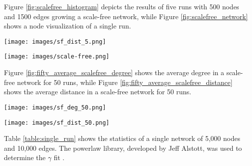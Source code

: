 \documentclass[journal]{IEEEtran}
\begin{document}
\noindent Figure \ref{fig:scalefree_histogram} depicts the results of five runs with 500 nodes and 1500 edges growing a scale-free network, while Figure \ref{fig:scalefree_network} shows a node visualization of a single run.

\begingroup
    \centering
    \medskip
    \texttt{[image: images/sf\_dist\_5.png]}
    \label{fig:scalefree_histogram}
    \medskip
\endgroup

\bigskip
\bigskip
\bigskip

\begingroup
    \centering
    \texttt{[image: images/scale-free.png]}
    \label{fig:scalefree_network}
\endgroup

\newpage

\noindent Figure \ref{fig:fifty_average_scalefree_degree} shows the average degree in a scale-free network for 50 runs, while Figure \ref{fig:fifty_average_scalefree_distance} shows the average distance in a scale-free network for 50 runs.

\begingroup
    \centering
    \medskip
    \texttt{[image: images/sf\_deg\_50.png]}
    \label{fig:fifty_average_scalefree_degree}
    \medskip
\endgroup

\bigskip
\bigskip
\bigskip

\begingroup
    \centering
    \medskip
    \texttt{[image: images/sf\_dist\_50.png]}
    \label{fig:fifty_average_scalefree_distance}
    \medskip
\endgroup


\newpage

\noindent Table \ref{table:single_run} shows the statistics of a single network of 5,000 nodes and 10,000 edges. The powerlaw library, developed by Jeff Alstott, was used to determine the $\gamma$ fit \cite{powerlaw}.
\medskip
\end{document}
